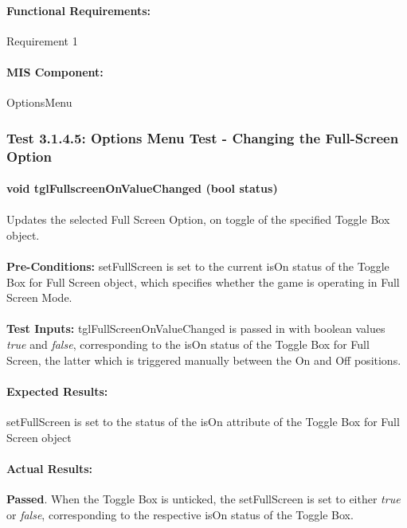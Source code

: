 \documentclass{article}
\begin{document}
    \paragraph{Functional Requirements:} Requirement 1
    \paragraph{MIS Component:} OptionsMenu
    
    \subsubsection{Test 3.1.4.5: Options Menu Test - Changing the Full-Screen Option}
    \paragraph{}\textbf{void tglFullscreenOnValueChanged (bool status)}
    \paragraph{} Updates the selected Full Screen Option, on toggle of the specified Toggle Box object.
    \paragraph{}\textbf{Pre-Conditions:} setFullScreen is set to the current isOn status of the Toggle Box for Full Screen object, which specifies whether the game is operating in Full Screen Mode.
    \paragraph{}\textbf{Test Inputs:} tglFullScreenOnValueChanged is passed in with boolean values \emph{true} and \emph{false}, corresponding to the isOn status of the Toggle Box for Full Screen, the latter which is triggered manually between the On and Off positions.
    \paragraph{Expected Results:} setFullScreen is set to the status  of the isOn attribute of the Toggle Box for Full Screen object
    \paragraph{Actual Results:} \textbf{Passed}. When the Toggle Box is unticked, the setFullScreen is set to either \emph{true} or \emph{false}, corresponding to the respective isOn status of the Toggle Box.
\end{document}
